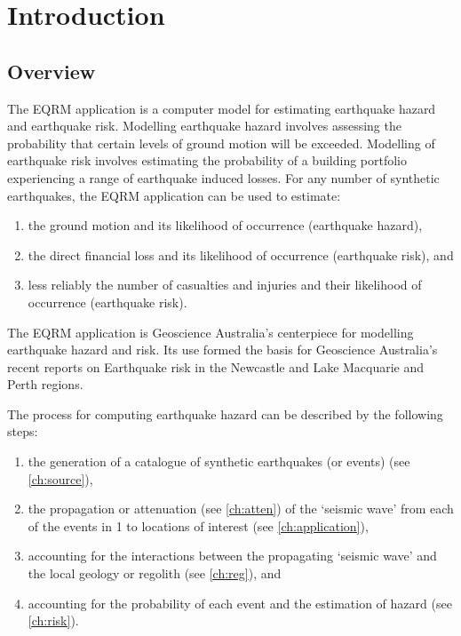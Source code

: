 \chapter{Introduction}
\label{ch:intro}

\section{Overview}

The EQRM application is a computer model for estimating earthquake
hazard and earthquake risk. Modelling earthquake hazard involves
assessing the probability that certain levels of ground motion
will be exceeded. Modelling of earthquake risk involves estimating
the probability of a building portfolio experiencing a range of
earthquake induced losses. For any number of synthetic
earthquakes, the EQRM application can be used to estimate:
\begin{enumerate}
\item the ground motion and its likelihood of occurrence
(earthquake hazard), \item the direct financial loss and its
likelihood of occurrence (earthquake risk), and \item less
reliably the number of casualties and injuries and their
likelihood of occurrence (earthquake risk).
\end{enumerate}

The EQRM application is Geoscience Australia's centerpiece for
modelling earthquake hazard and risk. Its use formed the basis for
Geoscience Australia's recent reports on Earthquake risk in the
Newcastle and Lake Macquarie \citep*{dr_Dhu02a} and Perth
\citep*{dr_Sinadinovski05a} regions.

The process for computing earthquake hazard can be described by
the following steps:
\begin{enumerate}
\item the generation of a catalogue of synthetic earthquakes (or
events) (see \cref{ch:source}), 
\item the propagation or
attenuation (see \cref{ch:atten}) of the `seismic wave' from each
of the events in 1 to locations of interest (see \cref{ch:application}),
\item accounting for the interactions between the propagating
`seismic wave' and the local geology or regolith (see
\cref{ch:reg}), and \item accounting for the probability of each
event and the estimation of hazard (see \cref{ch:risk}).
\end{enumerate}


